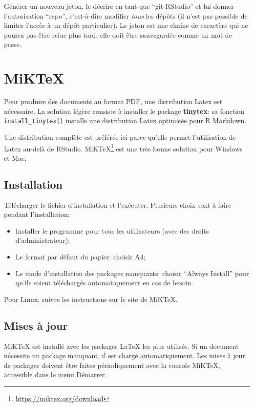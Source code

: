 \documentclass[
  12pt,
  french,
  a4paper,
  extrafontsizes,onecolumn,openright
  ]{memoir}
\providecommand{\tightlist}{%
  \setlength{\itemsep}{0pt}\setlength{\parskip}{0pt}}
\begin{document}
Générer un nouveau jeton, le décrire en tant que \enquote{git-RStudio} et lui donner l'autorisation \enquote{repo}, c'est-à-dire modifier \emph{tous} les dépôts (il n'est pas possible de limiter l'accès à un dépôt particulier).
Le jeton est une chaîne de caractère qui ne pourra pas être relue plus tard: elle doit être sauvegardée comme un mot de passe.

\hypertarget{miktex}{%
\section{MiKTeX}\label{miktex}}

Pour produire des documents au format PDF, une distribution Latex est nécessaire.
La solution légère consiste à installer le package \textbf{tinytex}: sa fonction \texttt{install\_tinytex()} installe une distribution Latex optimisée pour R Markdown.

Une distribution complète est préférée ici parce qu'elle permet l'utilisation de Latex au-delà de RStudio.
MiKTeX\footnote{\url{https://miktex.org/download}} est une très bonne solution pour Windows et Mac.

\hypertarget{installation-2}{%
\subsection{Installation}\label{installation-2}}

Télécharger le fichier d'installation et l'exécuter.
Plusieurs choix sont à faire pendant l'installation:

\begin{itemize}
\tightlist
\item
  Installer le programme pour tous les utilisateurs (avec des droits d'administrateur);
\item
  Le format par défaut du papier: choisir A4;
\item
  Le mode d'installation des packages manquants: choisir \enquote{Always Install} pour qu'ils soient téléchargés automatiquement en cas de besoin.
\end{itemize}

Pour Linux, suivre les instructions sur le site de MiKTeX.

\hypertarget{mises-uxe0-jour}{%
\subsection{Mises à jour}\label{mises-uxe0-jour}}

MiKTeX est installé avec les packages LaTeX les plus utilisés.
Si un document nécessite un package manquant, il est chargé automatiquement.
Les mises à jour de packages doivent être faites périodiquement avec la console MiKTeX, accessible dans le menu Démarrer.
\end{document}
